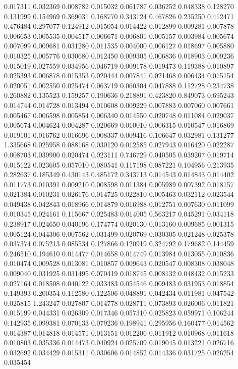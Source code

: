 0.017311
0.032369
0.008782
0.015032
0.061787
0.036252
0.048338
0.128270
0.131999
0.154969
0.369031
0.168770
0.343124
0.467826
0.235250
0.412471
0.476484
0.297077
0.124912
0.015054
0.014422
0.012899
0.009281
0.007878
0.006653
0.005535
0.004517
0.006671
0.006801
0.005157
0.003984
0.005674
0.007099
0.009681
0.031280
0.011535
0.004000
0.006127
0.018697
0.005880
0.010325
0.005776
0.030680
0.012450
0.009305
0.006836
0.018903
0.009236
0.015019
0.027559
0.034956
0.046719
0.009178
0.019473
0.119388
0.010897
0.025393
0.006878
0.015353
0.020444
0.007841
0.021468
0.006434
0.015154
0.020051
0.002550
0.025474
0.063719
0.060304
0.047888
0.112728
0.234738
0.260882
0.135523
0.159257
0.190636
0.218891
0.423820
0.849073
0.695243
0.014744
0.014728
0.013494
0.010608
0.009229
0.007883
0.007060
0.007661
0.005467
0.006598
0.005854
0.006340
0.014550
0.020748
0.011084
0.029037
0.005674
0.004624
0.004287
0.020669
0.010010
0.006315
0.010547
0.016869
0.019101
0.016762
0.016696
0.008337
0.009416
0.106647
0.032981
0.131277
1.335668
0.025958
0.088168
0.030120
0.012585
0.027943
0.016420
0.022287
0.008703
0.039900
0.020474
0.023111
0.746729
0.040505
0.039207
0.019714
0.015122
0.023605
0.057010
0.080541
0.117198
0.087221
0.104956
0.213935
0.282637
0.185349
0.430143
0.485172
0.343713
0.014543
0.014843
0.014402
0.011773
0.010391
0.009210
0.008598
0.011384
0.005989
0.007392
0.018157
0.021384
0.010231
0.026176
0.014725
0.022810
0.005463
0.032112
0.023544
0.049438
0.042843
0.018966
0.014879
0.016988
0.012751
0.007630
0.011099
0.010345
0.024161
0.115667
0.025483
0.014005
0.563217
0.045291
0.034118
0.238917
0.024650
0.040196
0.174774
0.020130
0.013160
0.009685
0.001315
0.005124
0.044306
0.007562
0.031499
0.020769
0.030305
0.021248
0.025378
0.037374
0.075213
0.085534
0.127866
0.120919
0.324792
0.179682
0.144459
0.246510
0.194610
0.014477
0.014658
0.014749
0.013984
0.013055
0.010836
0.010474
0.009528
0.013081
0.010857
0.009643
0.020547
0.008308
0.038048
0.009040
0.031925
0.031495
0.070419
0.018745
0.008132
0.048432
0.015233
0.027164
0.018508
0.040122
0.033483
0.054546
0.009483
0.031953
0.018854
0.149393
0.200354
0.112580
0.122506
0.048891
0.042434
0.011981
0.047542
0.025815
1.243247
0.027807
0.014778
0.028711
0.073893
0.026006
0.011821
0.015199
0.044331
0.026309
0.017346
0.057310
0.025823
0.059971
0.106244
0.142935
0.099381
0.070133
0.079236
0.198941
0.295956
0.160477
0.014562
0.014387
0.014818
0.014571
0.013151
0.012206
0.011912
0.010968
0.011618
0.010803
0.035336
0.014473
0.040924
0.025709
0.019045
0.013221
0.026716
0.032692
0.034429
0.015311
0.030606
0.014852
0.014336
0.031725
0.026254
0.035454
